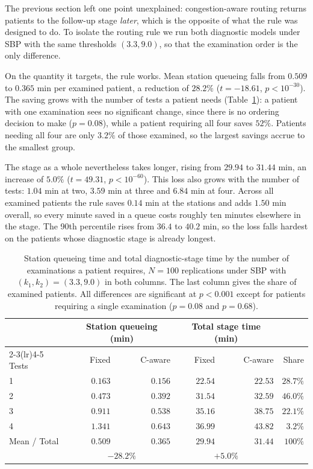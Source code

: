 \documentclass[sigconf]{acmart}
\begin{document}
The previous section left one point unexplained: congestion-aware routing
returns patients to the follow-up stage \emph{later}, which is the opposite of
what the rule was designed to do. To isolate the routing rule we run both
diagnostic models under SBP with the same thresholds $(3.3,9.0)$, so that the
examination order is the only difference.

On the quantity it targets, the rule works. Mean station queueing falls from
$0.509$ to $0.365$ min per examined patient, a reduction of $28.2\%$
($t=-18.61$, $p<10^{-30}$). The saving grows with the number of tests a patient
needs (Table~\ref{tab:sojourn}): a patient with one examination sees no
significant change, since there is no ordering decision to make ($p=0.08$),
while a patient requiring all four saves $52\%$. Patients needing all four are
only $3.2\%$ of those examined, so the largest savings accrue to the smallest
group.

The stage as a whole nevertheless takes longer, rising from $29.94$ to $31.44$
min, an increase of $5.0\%$ ($t=49.31$, $p<10^{-60}$). This loss also grows with
the number of tests: $1.04$ min at two, $3.59$ min at three and $6.84$ min at
four. Across all examined patients the rule saves $0.14$ min at the stations
and adds $1.50$ min overall, so every minute saved in a queue costs roughly ten
minutes elsewhere in the stage. The 90th percentile rises from $36.4$ to $40.2$
min, so the loss falls hardest on the patients whose diagnostic stage is
already longest.

\begin{table}[t]
\caption{Station queueing time and total diagnostic-stage time by the number of
examinations a patient requires, $N=100$ replications under SBP with
$(k_1,k_2)=(3.3,9.0)$ in both columns. The last column gives the share of
examined patients. All differences are significant at $p<0.001$ except for
patients requiring a single examination ($p=0.08$ and $p=0.68$).}
\label{tab:sojourn}
\small
\setlength{\tabcolsep}{4pt}
\begin{tabular}{@{}lrrrrr@{}}
\toprule
& \multicolumn{2}{c}{Station queueing (min)} &
\multicolumn{2}{c}{Total stage time (min)} & \\
\cmidrule(lr){2-3}\cmidrule(lr){4-5}
Tests & Fixed & C-aware & Fixed & C-aware & Share \\
\midrule
1 & $0.163$ & $0.156$ & $22.54$ & $22.53$ & $28.7\%$ \\
2 & $0.473$ & $0.392$ & $31.54$ & $32.59$ & $46.0\%$ \\
3 & $0.911$ & $0.538$ & $35.16$ & $38.75$ & $22.1\%$ \\
4 & $1.341$ & $0.643$ & $36.99$ & $43.82$ & $3.2\%$ \\
\midrule
Mean / Total & $0.509$ & $\mathbf{0.365}$ & $29.94$ & $\mathbf{31.44}$ & $100\%$ \\
& \multicolumn{2}{c}{$-28.2\%$} & \multicolumn{2}{c}{$+5.0\%$} & \\
\bottomrule
\end{tabular}
\end{table}
\end{document}
